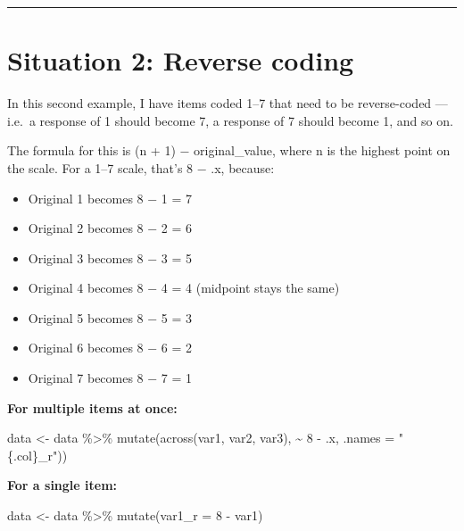 \documentclass[
  letterpaper,
  DIV=11,
  numbers=noendperiod]{scrreprt}
\newenvironment{Shaded}{\begin{snugshade}}{\end{snugshade}}
\newcommand{\AttributeTok}[1]{\textcolor[rgb]{0.40,0.45,0.13}{#1}}
\newcommand{\DecValTok}[1]{\textcolor[rgb]{0.68,0.00,0.00}{#1}}
\newcommand{\ErrorTok}[1]{\textcolor[rgb]{0.68,0.00,0.00}{#1}}
\newcommand{\FunctionTok}[1]{\textcolor[rgb]{0.28,0.35,0.67}{#1}}
\newcommand{\NormalTok}[1]{\textcolor[rgb]{0.00,0.23,0.31}{#1}}
\newcommand{\OtherTok}[1]{\textcolor[rgb]{0.00,0.23,0.31}{#1}}
\newcommand{\SpecialCharTok}[1]{\textcolor[rgb]{0.37,0.37,0.37}{#1}}
\newcommand{\StringTok}[1]{\textcolor[rgb]{0.13,0.47,0.30}{#1}}
\providecommand{\tightlist}{%
  \setlength{\itemsep}{0pt}\setlength{\parskip}{0pt}}\usepackage{longtable,booktabs,array}
\begin{document}
\begin{center}\rule{0.5\linewidth}{0.5pt}\end{center}

\section{\texorpdfstring{\textbf{Situation 2: Reverse
coding}}{Situation 2: Reverse coding}}\label{situation-2-reverse-coding}

In this second example, I have items coded 1--7 that need to be
reverse-coded --- i.e.~a response of 1 should become 7, a response of 7
should become 1, and so on.

The formula for this is (n + 1) − original\_value, where n is the
highest point on the scale. For a 1--7 scale, that's 8 − .x, because:

\begin{itemize}
\tightlist
\item
  Original 1 becomes 8 − 1 = 7
\item
  Original 2 becomes 8 − 2 = 6
\item
  Original 3 becomes 8 − 3 = 5
\item
  Original 4 becomes 8 − 4 = 4 (midpoint stays the same)
\item
  Original 5 becomes 8 − 5 = 3
\item
  Original 6 becomes 8 − 6 = 2
\item
  Original 7 becomes 8 − 7 = 1
\end{itemize}

\textbf{For multiple items at once:}

\begin{Shaded}
\begin{Highlighting}[]
\NormalTok{data }\OtherTok{\textless{}{-}}\NormalTok{ data }\SpecialCharTok{\%\textgreater{}\%}
  \FunctionTok{mutate}\NormalTok{(}\FunctionTok{across}\NormalTok{(var1, var2, var3), }\SpecialCharTok{\textasciitilde{}} \DecValTok{8} \SpecialCharTok{{-}}\NormalTok{ .x, }\AttributeTok{.names =} \StringTok{"\{.col\}\_r"}\NormalTok{)}\ErrorTok{)}
\end{Highlighting}
\end{Shaded}

\textbf{For a single item:}

\begin{Shaded}
\begin{Highlighting}[]
\NormalTok{data }\OtherTok{\textless{}{-}}\NormalTok{ data }\SpecialCharTok{\%\textgreater{}\%}
  \FunctionTok{mutate}\NormalTok{(}\AttributeTok{var1\_r =} \DecValTok{8} \SpecialCharTok{{-}}\NormalTok{ var1)}
\end{Highlighting}
\end{Shaded}
\end{document}
